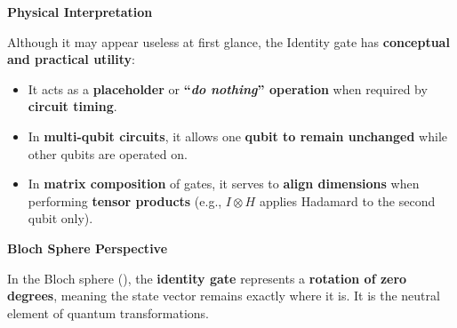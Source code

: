 \highspace
\begin{flushleft}
    \textcolor{Green3}{ \textbf{Physical Interpretation}}
\end{flushleft}
Although it may appear useless at first glance, the Identity gate has \textbf{conceptual and practical utility}:
\begin{itemize}[label=\textcolor{Green3}{}]
    \item It acts as a \textbf{placeholder} or \textbf{``\emph{do nothing}'' operation} when required by \textbf{circuit timing}.
    \item In \textbf{multi-qubit circuits}, it allows one \textbf{qubit to remain unchanged} while other qubits are operated on.
    \item In \textbf{matrix composition} of gates, it serves to \textbf{align dimensions} when performing \textbf{tensor products} (e.g., $I \otimes H$ applies Hadamard to the second qubit only).
\end{itemize}

\highspace
\begin{flushleft}
    \textcolor{Green3}{ \textbf{Bloch Sphere Perspective}}
\end{flushleft}
In the Bloch sphere (), the \textbf{identity gate} represents a \textbf{rotation of zero degrees}, meaning the state vector remains exactly where it is. It is the neutral element of quantum transformations.
